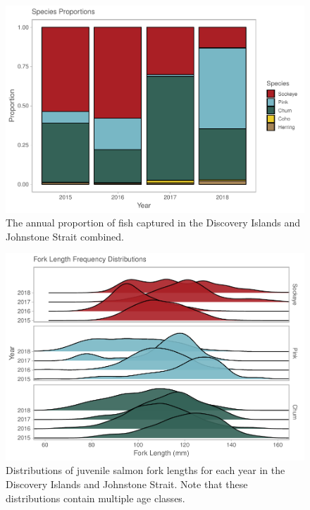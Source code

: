 \documentclass[fleqn,10pt]{wlpeerj} %
\begin{document}
\begin{figure}[H]
\includegraphics[width=0.9\linewidth]{Migration_Observations_Report_files/figure-latex/proportion-plot-1} \caption{The annual proportion of fish captured in the Discovery Islands and Johnstone Strait combined.}\label{fig:proportion-plot}
\end{figure}

\begin{figure}[H]
\includegraphics[width=0.9\linewidth]{Migration_Observations_Report_files/figure-latex/length-plot-1} \caption{Distributions of juvenile salmon fork lengths for each year in the Discovery Islands and Johnstone Strait. Note that these distributions contain multiple age classes.}\label{fig:length-plot}
\end{figure}
\end{document}
